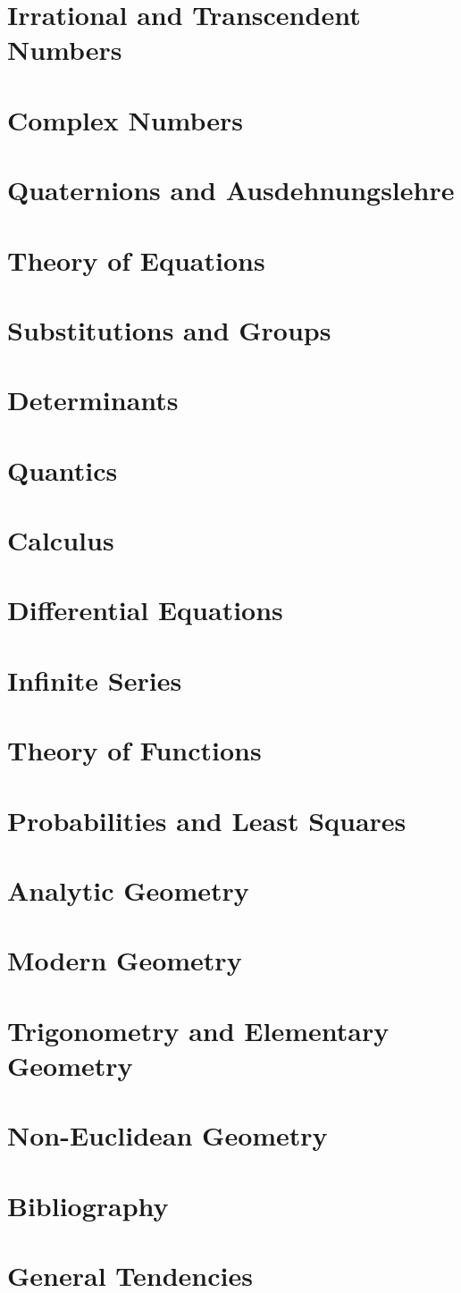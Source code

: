 \documentclass{book}
\begin{document}
\chapter{Irrational and Transcendent Numbers}
\chapter{Complex Numbers}
\chapter{Quaternions and Ausdehnungslehre}
\chapter{Theory of Equations}
\chapter{Substitutions and Groups}
\chapter{Determinants}
\chapter{Quantics}
\chapter{Calculus}
\chapter{Differential Equations}
\chapter{Infinite Series}
\chapter{Theory of Functions}
\chapter{Probabilities and Least Squares}
\chapter{Analytic Geometry}
\chapter{Modern Geometry}
\chapter{Trigonometry and Elementary Geometry}
\chapter{Non-Euclidean Geometry}
\chapter{Bibliography}
\chapter{General Tendencies}

\backmatter
{}
\printindex
\end{document}
